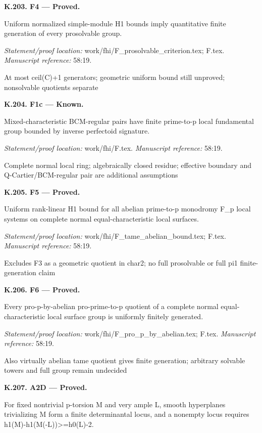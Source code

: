 \par\medskip\noindent\textbf{K.203. F4 --- Proved.}\par
Uniform normalized simple-module H1 bounds imply quantitative finite generation of every prosolvable group.
\par\emph{Statement/proof location:} work/fhi/F\_prosolvable\_criterion.tex; F.tex.
\emph{Manuscript reference:} 58:19.
\par At most ceil(C)+1 generators; geometric uniform bound still unproved; nonsolvable quotients separate
\par\medskip\noindent\textbf{K.204. F1c --- Known.}\par
Mixed-characteristic BCM-regular pairs have finite prime-to-p local fundamental group bounded by inverse perfectoid signature.
\par\emph{Statement/proof location:} work/fhi/F.tex.
\emph{Manuscript reference:} 58:19.
\par Complete normal local ring; algebraically closed residue; effective boundary and Q-Cartier/BCM-regular pair are additional assumptions
\par\medskip\noindent\textbf{K.205. F5 --- Proved.}\par
Uniform rank-linear H1 bound for all abelian prime-to-p monodromy F\_p local systems on complete normal equal-characteristic local surfaces.
\par\emph{Statement/proof location:} work/fhi/F\_tame\_abelian\_bound.tex; F.tex.
\emph{Manuscript reference:} 58:19.
\par Excludes F3 as a geometric quotient in char2; no full prosolvable or full pi1 finite-generation claim
\par\medskip\noindent\textbf{K.206. F6 --- Proved.}\par
Every pro-p-by-abelian pro-prime-to-p quotient of a complete normal equal-characteristic local surface group is uniformly finitely generated.
\par\emph{Statement/proof location:} work/fhi/F\_pro\_p\_by\_abelian.tex; F.tex.
\emph{Manuscript reference:} 58:19.
\par Also virtually abelian tame quotient gives finite generation; arbitrary solvable towers and full group remain undecided
\par\medskip\noindent\textbf{K.207. A2D --- Proved.}\par
For fixed nontrivial p-torsion M and very ample L, smooth hyperplanes trivializing M form a finite determinantal locus, and a nonempty locus requires h1(M)-h1(M(-L))>=h0(L)-2.
